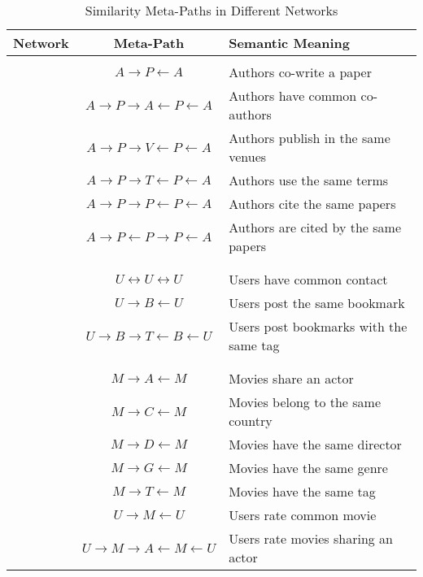 \begin{table}[t]
	\centering
	\caption{Similarity Meta-Paths in Different Networks}
	\label{table:meta}
	\scriptsize
	\begin{tabu} to \columnwidth {c c X[l]}
		\toprule
		Network & Meta-Path & Semantic Meaning \\
		\midrule
		&&\\
		& $A\rightarrow P\leftarrow A$ & Authors co-write a paper\\
		& $A\rightarrow P\rightarrow A\leftarrow P\leftarrow A$ & Authors have common co-authors\\
		& $A\rightarrow P\rightarrow V\leftarrow P\leftarrow A$ & Authors publish in the same venues\\
		& $A\rightarrow P\rightarrow T\leftarrow P\leftarrow A$ & Authors use the same terms\\
		& $A\rightarrow P\rightarrow P\leftarrow P\leftarrow A$ & Authors cite the same papers\\
		& $A\rightarrow P\leftarrow P\rightarrow P\leftarrow A$ & Authors are cited by the same papers\\
		&&\\
		\midrule
		&&\\
		& $U\leftrightarrow U\leftrightarrow U$ & Users have common contact\\
		& $U\rightarrow B\leftarrow U$ & Users post the same bookmark\\
		& $U\rightarrow B\rightarrow T\leftarrow B\leftarrow U$ & Users post bookmarks with the same tag\\
		&&\\
		\midrule
		&&\\
		& $M\rightarrow A\leftarrow M$ & Movies share an actor\\
		& $M\rightarrow C\leftarrow M$ & Movies belong to the same country\\
		& $M\rightarrow D\leftarrow M$ & Movies have the same director\\
		& $M\rightarrow G\leftarrow M$ & Movies have the same genre\\
		& $M\rightarrow T\leftarrow M$ & Movies have the same tag\\
		& $U\rightarrow M\leftarrow U$ & Users rate common movie\\
		& $U\rightarrow M\rightarrow A\leftarrow M\leftarrow U$ & Users rate movies sharing an actor\\

\end{tabu}
\end{table}

